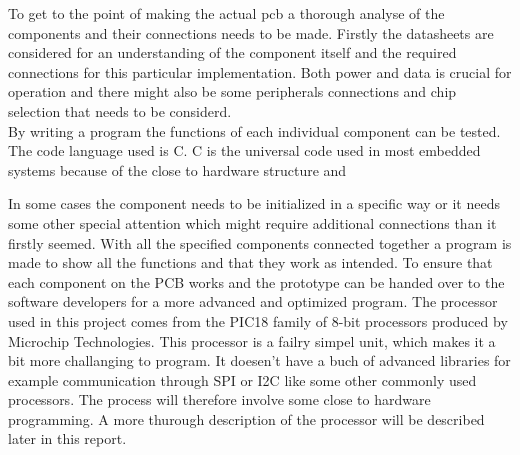 To get to the point of making the actual \gls{pcb} a thorough analyse of the components and their connections needs to be made. Firstly the datasheets are considered for an understanding of the component itself and the required connections for this particular implementation. Both power and data is crucial for operation and there might also be some peripherals connections and chip selection that needs to be considerd. \\
By writing a program the functions of each individual component can be tested. The code language used is C. C is the universal code used in most embedded systems because of the close to hardware structure and 

 In some cases the component needs to be initialized in a specific way or it needs some other special attention which might require additional connections than it firstly seemed.
With all the specified components connected together a program is made to show all the functions and that they work as intended. 
To ensure that each component on the PCB works and the prototype can be handed over to the software developers for a more advanced and optimized program. 
The processor used in this project comes from the PIC18 family of 8-bit processors produced by Microchip Technologies. This processor is a failry simpel unit, which makes it a bit more challanging to program. It doesen't have a buch of advanced libraries for example communication through SPI or I2C like some other commonly used processors. The process will therefore involve some close to hardware programming. A more thurough description of the processor will be described later in this report.  

